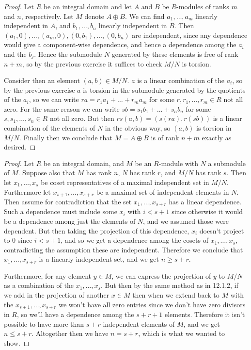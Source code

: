 \documentclass[11pt]{article}
\begin{document}
\begin{proof}
  Let $R$ be an integral domain and let $A$ and $B$ be $R$-modules of ranks $m$ and $n$, respectively. Let $M$ denote $A \oplus B$.
  We can find $a_1, \dots, a_m$ linearly independent in $A$, and $b_1, \dots, b_n$ linearly independent in $B$.
  Then $(a_1,0), \dots, (a_m,0), (0,b_1), \dots, (0,b_n)$ are independent, since any dependence would give a component-wise dependence, and hence a dependence among the $a_i$ and the $b_j$.
  Hence the submodule $N$ generated by these elements is free of rank $n+m$, so by the previous exercise it suffices to check $M/N$ is torsion.

  Consider then an element $(a,b) \in M/N$.
  $a$ is a linear combination of the $a_i$, so by the previous exercise $a$ is torsion in the submodule generated by the quotients of the $a_i$, so we can write $ra = r_1a_1 + \dots + r_ma_m$ for some $r,r_1,\dots,r_m \in R$ not all zero.
  For the same reason we can write $sb = s_1b_1 + \dots + s_nb_n$ for some $s,s_1,\dots,s_n \in R$ not all zero.
  But then $rs(a,b) = (s(ra),r(sb))$ is a linear combination of the elements of $N$ in the obvious way, so $(a,b)$ is torsion in $M/N$.
  Finally then we conclude that $M = A \oplus B$ is of rank $n + m$ exactly as desired.
\end{proof}


\begin{proof}
  Let $R$ be an integral domain, and $M$ be an $R$-module with $N$ a submodule of $M$.
  Suppose also that $M$ has rank $n$, $N$ has rank $r$, and $M/N$ has rank $s$.
  Then let $x_1,\dots,x_s$ be coset representatives of a maximal independent set in $M/N$.
  Furthermore let $x_{s+1},\dots,x_{s+r}$ be a maximal set of independent elements in $N$.
  Then assume for contradiction that the set $x_1,\dots,x_{s+r}$ has a linear dependence.
  Such a dependence must include some $x_i$ with $i < s+1$ since otherwise it would be a dependence among just the elements of $N$, and we assumed those were dependent.
  But then taking the projection of this dependence, $x_i$ doesn't project to $0$ since $i < s+1$, and so we get a dependence among the cosets of $x_1,\dots,x_s$, contradicting the assumption these are independent.
  Therefore we conclude that $x_1,\dots,x_{s+r}$ is a linearly independent set, and we get $n \ge s + r$.

  Furthermore, for any element $y \in M$, we can express the projection of $y$ to $M/N$ as a combination of the $x_1,\dots,x_s$.
  But then by the same method as in 12.1.2, if we add in the projection of another $x \in M$ then when we extend back to $M$ with the $x_{s+1},\dots,x_{s+r}$ we won't have all zero entries since we don't have zero divisors in $R$, so we'll have a dependence among the $s+r+1$ elements.
  Therefore it isn't possible to have more than $s+r$ independent elements of $M$, and we get $n \le s + r$.
  Altogether then we have $n = s+r$, which is what we wanted to show.
\end{proof}
\end{document}
